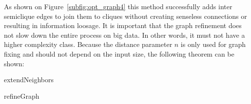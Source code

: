 As shown on Figure~\ref{subfig:opt_graph4} this method successfully adds inter semiclique edges to join them to cliques without creating senseless connections or resulting in information loosage. It is important that the graph refinement does not slow down the entire process on big data. In other words, it must not have a higher complexity class. Because the distance parameter $n$ is only used for graph fixing and should not depend on the input size, the following theorem can be shown:

\begin{algorithm}


	\caption{extendNeighbors}
\end{algorithm}

\begin{algorithm}


	\caption{refineGraph}
\end{algorithm}

